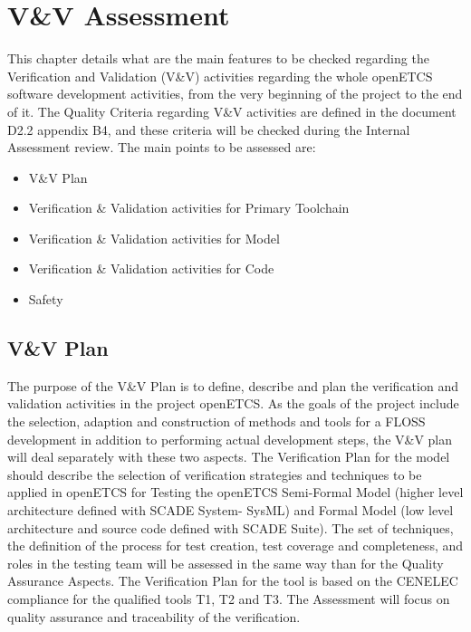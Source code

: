 \documentclass{template/openetcs_article}
\begin{document}
\section{V\&V Assessment}
This chapter details what are the main features to be checked regarding the Verification and Validation (V\&V) activities regarding the whole openETCS software
development activities, from the very beginning of the project to the end of it.
The Quality Criteria regarding V\&V activities are defined in the document D2.2 appendix B4, and these criteria will be checked during the Internal Assessment
review. The main points to be assessed are:
\begin{itemize}
\item V\&V Plan
\item Verification \& Validation activities for Primary Toolchain
\item Verification \& Validation activities for Model
\item Verification \& Validation activities for Code
\item Safety
\end{itemize}

\subsection{V\&V Plan}
The purpose of the V\&V Plan is to define, describe and plan the verification and validation activities in the project openETCS. As the goals of the project
include the selection, adaption and construction of methods and tools for a FLOSS development in addition to performing actual development steps, the V\&V plan
will deal separately with these two aspects.
The Verification Plan for the model should describe the selection of verification strategies and techniques to be applied in openETCS for Testing the openETCS Semi-Formal Model (higher level architecture defined with SCADE System- SysML) and Formal Model (low level architecture and source code defined with SCADE Suite). The set of techniques, the definition of the process for test creation, test coverage and completeness, and roles in
the testing team will be assessed in the same way than for the Quality Assurance Aspects.
The Verification Plan for the tool is based on the CENELEC compliance for the qualified tools T1, T2 and T3. The Assessment will focus on quality assurance and
traceability of the verification.
\end{document}
